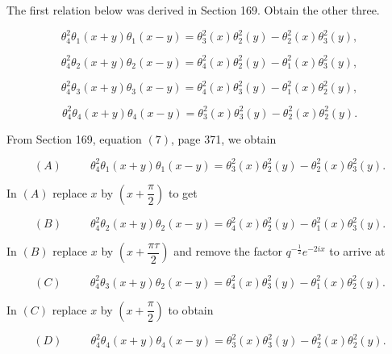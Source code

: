 \begin{problem}\label{problem9chapter20}
The first relation below was derived in Section 169. Obtain the other three.

$$\theta_4^2\theta_1(x+y)\theta_1(x-y)=\theta_3^2(x)\theta_2^2(y)-\theta_2^2(x)\theta_3^2(y),$$

$$\theta_4^2\theta_2(x+y)\theta_2(x-y)=\theta_4^2(x)\theta_2^2(y)-\theta_1^2(x)\theta_3^2(y),$$

$$\theta_4^2\theta_3(x+y)\theta_3(x-y) = \theta_4^2(x)\theta_3^2(y) -\theta_1^2(x)\theta_2^2(y),$$

$$\theta_4^2\theta_4(x+y)\theta_4(x-y)=\theta_3^2(x)\theta_3^2(y)-\theta_2^2(x)\theta_2^2(y).$$
\end{problem}
\begin{solution}
From Section 169, equation $(7)$, page 371, we obtain

$$(A) \hspace{30pt} \theta_4^2 \theta_1(x+y) \theta_1(x-y) = \theta_3^2(x) \theta_2^2(y) - \theta_2^2(x) \theta_3^2(y).$$

In $(A)$ replace $x$ by $\left( x + \dfrac{\pi}{2} \right)$ to get

$$(B) \hspace{30pt} \theta_4^2 \theta_2(x+y) \theta_2(x-y) = \theta_4^2(x) \theta_2^2(y) - \theta_1^2(x) \theta_3^2(y).$$

In $(B)$ replace $x$ by $\left( x + \dfrac{\pi \tau}{2} \right)$ and remove the factor $q^{-\frac{1}{2}} e^{-2ix}$ to arrive at

$$(C) \hspace{30pt} \theta_4^2 \theta_3(x+y) \theta_2(x-y) = \theta_4^2(x) \theta_3^2(y) - \theta_1^2(x) \theta_2^2(y).$$

In $(C)$ replace $x$ by $\left( x + \dfrac{\pi}{2} \right)$ to obtain

$$(D) \hspace{30pt} \theta_4^2  \theta_4(x+y) \theta_4(x-y) = \theta_3^2(x) \theta_3^2(y) - \theta_2^2(x) \theta_2^2(y).$$
\end{solution}
